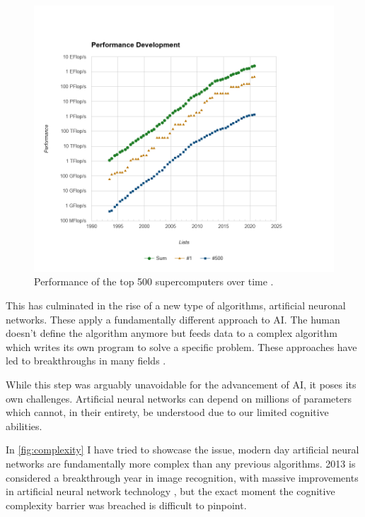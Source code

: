 \begin{figure}[H]
\centering
\includegraphics[width=\linewidth]{images/01_Intro/Top500.png}
\caption{Performance of the top 500 supercomputers over time \cite{top500}.}
\label{fig:topComp}
\end{figure}

This has culminated in the rise of a new type of algorithms, artificial neuronal networks. These apply a fundamentally different approach to AI. The human doesn't define the algorithm anymore but feeds data to a complex algorithm which writes its own program to solve a specific problem. These approaches have led to breakthroughs in many fields \cite{10.1145/3065386}. \par
While this step was arguably unavoidable for the advancement of AI, it poses its own challenges. Artificial neural networks can depend on millions of parameters \cite{szegedy2015going} which cannot, in their entirety, be understood due to our limited cognitive abilities. 

In \autoref{fig:complexity} I have tried to showcase the issue, modern day artificial neural networks are fundamentally more complex than any previous algorithms. 2013 is considered a breakthrough year in image recognition, with massive improvements in artificial neural network technology \cite{ILSVRC15}, but the exact moment the cognitive complexity barrier was breached is difficult to pinpoint.


